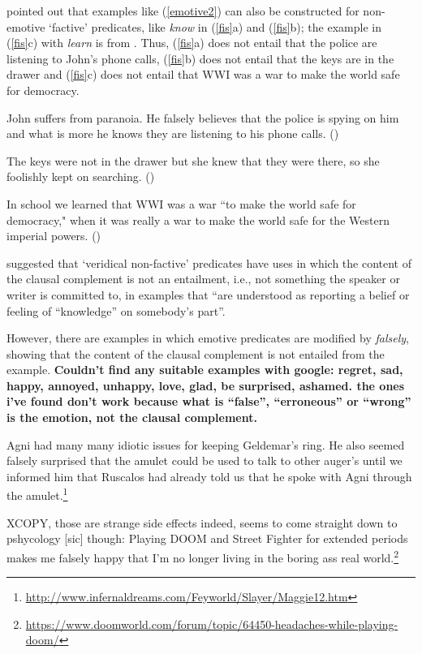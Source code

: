 \documentclass[11pt,fleqn]{article}
\newcommand{\6}{\mbox{$[\hspace*{-.6mm}[$}}
\newcommand{\9}{\mbox{$]\hspace*{-.6mm}]$}}
\begin{document}
\citet[514]{abrusan2011} pointed out that examples like (\ref{emotive2})  can also be constructed for non-emotive `factive' predicates, like {\em know} in (\ref{fis}a) and (\ref{fis}b); the example in (\ref{fis}c) with {\em learn} is from \citealt{hazlett2010}. Thus, (\ref{fis}a) does not entail that the police are listening to John's phone calls, (\ref{fis}b) does not entail that the keys are in the drawer and (\ref{fis}c) does not entail that WWI was a war to make the world safe for democracy.

\begin{exe}
\ex\label{fis}
\begin{xlist}

\ex John suffers from paranoia. He falsely believes that the police is spying on him and what is more he knows they are listening to his phone calls. \hfill (\citealt[514]{abrusan2011})

\ex The keys were not in the drawer but she knew that they were there, so she foolishly kept on searching. \hfill (\citealt[514]{abrusan2011})

\ex In school we learned that WWI was a war ``to make the world safe for democracy," when it was really a war to make the world safe for the Western imperial powers. \hfill (\citealt[501]{hazlett2010})

\end{xlist}

\end{exe}
\citet[515]{abrusan2011} suggested that `veridical non-factive' predicates have uses in which the content of the clausal complement is not an entailment, i.e., not something the speaker or writer is committed to, in examples that ``are understood as reporting a belief or feeling of ``knowledge'' on somebody's part''. 

However, there are examples in which emotive predicates are modified by {\em falsely}, showing that the content of the clausal complement is not entailed from the example. {\bf Couldn't find any suitable examples with google: regret, sad, happy, annoyed, unhappy, love, glad, be surprised, ashamed. the ones i've found don't work because what is ``false'', ``erroneous'' or ``wrong'' is the emotion, not the clausal complement.}

\begin{exe}
\ex\label{falsely}
\begin{xlist}
\ex Agni had many many idiotic issues for keeping Geldemar's ring. He also seemed falsely surprised that the amulet could be used to talk to other auger's until we informed him that Ruscalos had already told us that he spoke with Agni through the amulet.\footnote{\url{http://www.infernaldreams.com/Feyworld/Slayer/Maggie12.htm}}

\ex XCOPY, those are strange side effects indeed, seems to come straight down to pshycology [sic] though: Playing DOOM and Street Fighter for extended periods makes me falsely happy that I'm no longer living in the boring ass real world.\footnote{\url{https://www.doomworld.com/forum/topic/64450-headaches-while-playing-doom/}}
\end{xlist}
\end{exe}
\end{document}

